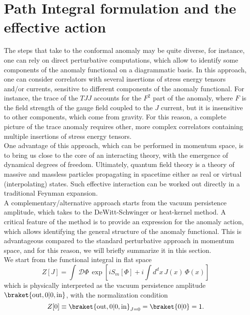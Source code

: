 \documentclass[a4paper,11pt,openright,twoside]{book}
\numberwithin{equation}{section}
\begin{document}
{{\section{Path Integral formulation and the effective action}
The steps that take to the conformal anomaly may be quite diverse, 
for instance, one can rely on direct perturbative computations, which allow to identify some components of the anomaly functional on a diagrammatic basis. 
In this approach, one can consider correlators with several insertions of stress energy tensors and/or currents, sensitive to different components of the anomaly functional. For instance, the trace of the $TJJ$ accounts for the $F^2$ part of the anomaly, where $F$ is the field strength of the gauge field coupled to the $J$ current, but it is insensitive to other components, which come from gravity. For this reason, a complete picture of the trace anomaly requires other, more complex correlators containing multiple insertions of stress energy tensors.\\
One advantage of this approach, which can be performed in momentum space, is to bring us close to the core of an interacting theory, with the emergence of dynamical degrees of freedom. Ultimately, quantum field theory is a theory of massive and massless particles propagating in spacetime either as real or virtual 
(interpolating) states. Such effective interaction can be worked out directly in a traditional Feynman expansion. \\
A complementary/alternative approach starts from the vacuum persistence amplitude, which takes to the DeWitt-Schwinger or heat-kernel method. A critical feature of the method is to provide an expression for the anomaly action, which allows identifying the general structure of the anomaly functional. This is advantageous compared to the standard perturbative approach in momentum space, and for this reason, we will briefly summarize it in this section. \\  
We start from the functional integral in flat space
\begin{equation}
	Z[J]=\int\,\mathcal{D}\Phi\,\exp\left[iS_m[\Phi]+i\int d^dx\, J(x)\,\Phi(x)\right]\label{pathint}
\end{equation}
which is physically interpreted as the vacuum persistence amplitude $\braket{\text{out},0|0,\text{in}}$, with the normalization condition
\begin{equation}
	Z[0]\equiv\braket{\text{out},0|0,\text{in}}_{J=0}=\braket{0|0}=1.\label{normcond}

\end{equation}}}
\end{document}
